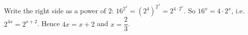 Write the right side as a power of $2$: $16^{2^x}=\left(2^4\right)^{2^x}=2^{4\cdot2^x}$. So $16^x=4\cdot2^x$, i.e.\ $2^{4x}=2^{x+2}$. Hence $4x=x+2$ and $x=\boxed{\dfrac{2}{3}}$.
